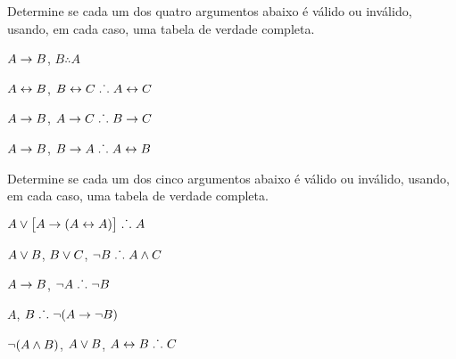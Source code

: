 \noindent\problempart
\label{pr.TT.valid2}
Determine se cada um dos quatro argumentos abaixo é válido ou inválido, usando, em cada caso, uma tabela de verdade completa.
\begin{earg}
\item $A\rightarrow B$, $B \therefore  A$ %

\item $A\leftrightarrow B$, $B\leftrightarrow C \mathrel{\ldotp\dot{}\,\ldotp} A\leftrightarrow C$ %

\item $A \rightarrow B$, $A \rightarrow C\mathrel{\ldotp\dot{}\,\ldotp} B \rightarrow C$ %

\item $A \rightarrow B$, $B \rightarrow A\mathrel{\ldotp\dot{}\,\ldotp} A \leftrightarrow B$ %

\end{earg}

\noindent\problempart
\label{pr.TT.valid3}
Determine se cada um dos cinco argumentos abaixo é válido ou inválido, usando, em cada caso, uma tabela de verdade completa.
\begin{earg}
\item $A\vee\bigl[A\rightarrow(A\leftrightarrow A)\bigr] \mathrel{\ldotp\dot{}\,\ldotp}  A $\vspace{.5ex}%
\item $A\vee B$, $B\vee C$, $\neg B \mathrel{\ldotp\dot{}\,\ldotp} A \wedge C$\vspace{.5ex} %
\item $A \rightarrow B$, $\neg A\mathrel{\ldotp\dot{}\,\ldotp} \neg B$ \vspace{.5ex}%
\item $A$, $B\mathrel{\ldotp\dot{}\,\ldotp} \neg(A\rightarrow \neg B)$ \vspace{.5ex}%
\item $\neg(A \wedge B)$, $A \vee B$, $A \leftrightarrow B\mathrel{\ldotp\dot{}\,\ldotp} C$ \vspace{.5ex}%
\end{earg}

